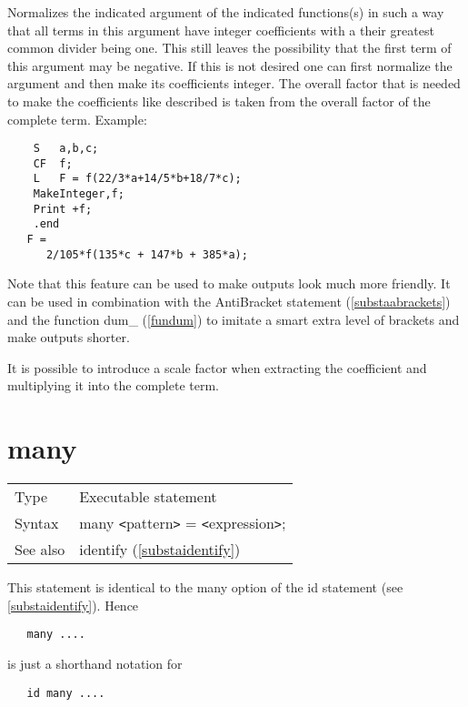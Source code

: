 \noindent Normalizes the indicated 
argument of the indicated functions(s) in such a way that 
all terms in this argument have integer 
coefficients with a their greatest common 
divider being one. This still leaves the possibility that the first term of 
this argument may be negative. If this is not desired one can first 
normalize the argument and then make its coefficients 
integer. The overall factor that is needed to make the coefficients like 
described is taken from the overall factor of the complete term. Example:
\begin{verbatim}
    S   a,b,c;
    CF  f;
    L   F = f(22/3*a+14/5*b+18/7*c);
    MakeInteger,f;
    Print +f;
    .end
   F =
      2/105*f(135*c + 147*b + 385*a);
\end{verbatim}

\noindent Note that this feature can be used to make outputs look much more 
friendly. It can be used in combination with the 
AntiBracket statement (\ref{substaabrackets}) and the 
function dum\_ (\ref{fundum}) to imitate a smart extra level 
of brackets and make outputs shorter.

It is possible to introduce a scale factor when extracting the coefficient 
and multiplying it into the complete term.

\vspace{10mm}

 
\section{many}
\label{substamany}

\noindent \begin{tabular}{ll}
Type & Executable statement\\
Syntax & many {\tt<}pattern{\tt>} = {\tt<}expression{\tt>};
\\ See also & identify (\ref{substaidentify})
\end{tabular} \vspace{4mm}

\noindent This statement is identical to the many option of the 
id statement (see \ref{substaidentify}). Hence
\begin{verbatim}
   many ....
\end{verbatim}
is just a shorthand notation for
\begin{verbatim}
   id many ....
\end{verbatim}
\vspace{10mm}

